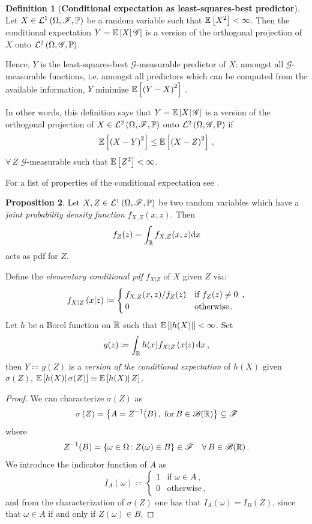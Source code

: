 \documentclass[10pt,a4paper]{book}
\theoremstyle{definition}
\newtheorem{defin}{Definition}[chapter]
\newtheorem{prop}[defin]{Proposition}
\begin{document}
\begin{appendices}
\begin{defin}[\textbf{Conditional expectation as least-squares-best predictor}]\label{Def:ExpOrthProj}
Let $X \in \mathcal{L}^1\left(\Omega,\mathscr{F},\mathbb{P}\right)$ be a random variable such that $\mathbb{E}\left[ X^2 \right]<\infty$. Then the conditional expectation $Y=\mathbb{E}\left[ {X} \middle\vert {\,\mathscr{G}} \right]$ is a version of the orthogonal projection of $X$ onto $\mathcal{L}^2\left(\Omega,\mathscr{G},\mathbb{P}\right)$. 

\noindent
Hence, $Y$ is the least-squares-best $\mathscr{G}$-measurable predictor of $X$: amongst all $\mathscr{G}$-measurable functions, i.e. amongst all predictors which can be computed from the available information, $Y$ minimize $\mathbb{E}\left[ \left(Y-X\right)^2 \right]$ \cite[p.~85]{Williams1991}. 
\end{defin}
In other words, this definition says that $Y=\mathbb{E}\left[ {X} \middle\vert {\,\mathscr{G}} \right]$ is a version of the orthogonal projection of $X\in \mathcal{L}^2\left(\Omega,\mathscr{F},\mathbb{P}\right)$ onto $\mathcal{L}^2\left(\Omega,\mathscr{G},\mathbb{P}\right)$ if 
$$
 \mathbb{E}\left[ \left(X-Y\right)^2 \right]\leq\mathbb{E}\left[ \left(X-Z\right)^2 \right]\,,
$$
$\forall\, Z$ $\mathscr{G}$-measurable such that $\mathbb{E}\left[ Z^2 \right]<\infty$.

\noindent 
For a list of properties of the conditional expectation see \cite[p.~88]{Williams1991}. 

\begin{prop}
Let $X,Z\in \mathcal{L}^1\left(\Omega,\mathscr{F},\mathbb{P}\right)$ be two random variables which have a \emph{joint probability density function} $f_{X,Z}(x,z)$. 
Then $$f_Z(z)=\int_{\mathbb{R}} f_{X,Z}(x,z)\mbox{d} x$$ acts as pdf for $Z$.

\noindent
Define the \emph{elementary conditional pdf} $f_{X\lvert Z}$ of $X$ given $Z$ via:
$$
f_{X\lvert Z}\left(x\lvert z\right) \coloneqq \begin{cases} 
 f_{X,Z}(x,z)/f_Z(z) & \text{if $f_Z(z)\neq 0$ }\,, \\ 
 0 & \text{otherwise}\,.
\end{cases}
$$
Let $h$ be a Borel function on $\mathbb{R}$ such that $\mathbb{E}\left[ \left| h(X)\right| \right]<\infty$. Set
$$
g(z) \coloneqq \int_{\mathbb{R}} h(x)f_{X\lvert Z}\left(x\lvert z\right)\mbox{d} x\,,
$$
then $Y\coloneqq g(Z)$ is a \emph{version of the conditional expectation} of $h(X)$ given $\sigma(Z)$, $\mathbb{E}\left[ {h(X)} \middle\vert {\,\sigma(Z)} \right]\equiv\mathbb{E}\left[ {h(X)} \middle\vert {\,Z} \right]$.
\end{prop}

\begin{proof}
We can characterize $\sigma(Z)$ as
$$\sigma\left(Z\right)=\left\lbrace A=Z^{-1}(B)\,,\;\mathrm{for}\,B\in\mathscr{B}(\mathbb{R})\right\rbrace\subseteq\mathscr{F}$$ where 
$$Z^{-1}(B)=\left\lbrace \omega\in\Omega\colon Z(\omega)\in B \right\rbrace\in\mathscr{F}\quad\forall\,B\in\mathscr{B}(\mathbb{R})\,. $$
We introduce the indicator function of $A$ as
$$
I_A(\omega) \coloneqq \begin{cases} 
 1 & \text{if $\omega\in A$}\,, \\ 
 0 & \text{otherwise}\,,
\end{cases}
$$
and from the characterization of $\sigma(Z)$ one has that $I_A(\omega)=I_B(Z)$, since that $\omega \in A$ if and only if $Z(\omega)\in B$.


\end{proof}
\end{appendices}
\end{document}
